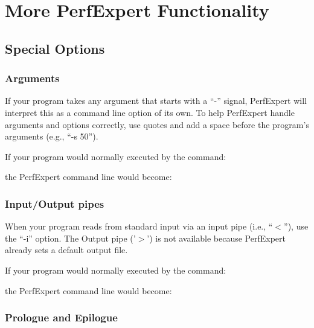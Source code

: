 \chapter{More PerfExpert Functionality}
\label{ch:ch05_more_perfexpert_functionality}

\section{Special Options}
\label{sec:Special_Options}

\subsection{Arguments}
\label{subsec:Arguments}

If your program takes any argument that starts with a ``-'' signal, PerfExpert will interpret this as a command line option of its own. To help PerfExpert handle arguments and options correctly, use quotes and add a space before the program's arguments (e.g., ``-s 50'').

If your program would normally executed by the command:
\begin{prompt}
\end{prompt}
the PerfExpert command line would become:
\begin{prompt}
\end{prompt}

\subsection{Input/Output pipes}
\label{subsec:IO_Pipes}

When your program reads from standard input via an input pipe (i.e., ``$<$''), use the ``-i'' option. The Output pipe ('$>$') is not available because PerfExpert already sets a default output file.

If your program would normally executed by the command:
\begin{prompt}
\end{prompt}
the PerfExpert command line would become:
\begin{prompt}
\end{prompt}

\subsection{Prologue and Epilogue}
\label{subsec:Prologue_Epilogue}

